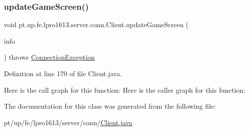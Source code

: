 \subsubsection{\texorpdfstring{update\+Game\+Screen()}{updateGameScreen()}}
{\footnotesize\ttfamily void pt.\+up.\+fe.\+lpro1613.\+server.\+conn.\+Client.\+update\+Game\+Screen (\begin{DoxyParamCaption}\item[{\hyperlink{classpt_1_1up_1_1fe_1_1lpro1613_1_1sharedlib_1_1tuples_1_1_game_u_i_info}{Game\+U\+I\+Info}}]{info }\end{DoxyParamCaption}) throws \hyperlink{classpt_1_1up_1_1fe_1_1lpro1613_1_1sharedlib_1_1exceptions_1_1_connection_exception}{Connection\+Exception}}



Definition at line 170 of file Client.\+java.

Here is the call graph for this function\+:
Here is the caller graph for this function\+:


The documentation for this class was generated from the following file\+:\begin{DoxyCompactItemize}
\item 
pt/up/fe/lpro1613/server/conn/\hyperlink{_client_8java}{Client.\+java}\end{DoxyCompactItemize}
